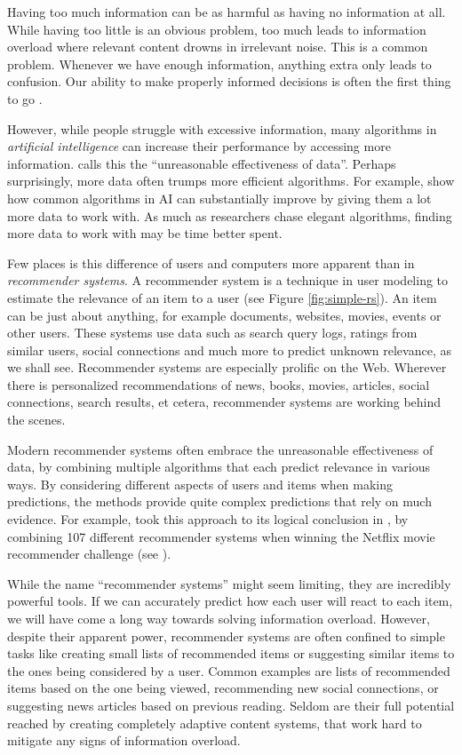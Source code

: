 \label{chap:intro}

Having too much information can be as harmful as having no information at all.
While having too little is an obvious problem,
too much leads to information overload where relevant content drowns in irrelevant noise.
This is a common problem. Whenever we have enough information,
anything extra only leads to confusion.
Our ability to make properly informed decisions is often the first thing to go
\cite[p1]{Davenport2001}.

However, while people struggle with excessive information,
many algorithms in \emph{artificial intelligence}  
can increase their performance by accessing more information.
\citet[p1]{Halevy2009} calls this the ``unreasonable effectiveness of data''.
Perhaps surprisingly, more data often trumps more efficient algorithms.
For example, \citet[p3]{Banko2001} show how common algorithms in AI 
can substantially improve by giving them a lot more data to work with.
As much as researchers chase elegant algorithms, finding more data to work with may be time better spent.

Few places is this difference of users and computers more apparent than in \emph{recommender systems}.
A recommender system is a technique in user modeling to estimate the relevance of an item to a user
(see Figure \ref{fig:simple-rs}).
An item can be just about anything, for example documents, websites, movies, events or other users.
These systems use data such as search query logs, 
ratings from similar users, social connections and much more
to predict unknown relevance, as we shall see.
Recommender systems are especially prolific on the Web. 
Wherever there is personalized recommendations of news, books, movies,
articles, social connections, search results, et cetera, recommender systems are working behind the scenes.

Modern recommender systems often embrace the 
unreasonable effectiveness of data,
by combining multiple algorithms that each predict relevance in various ways.
By considering different aspects of users and items when making predictions,
the methods provide quite complex predictions that rely on much evidence.
For example, \citeauthor{Bell2007} took this approach to its logical conclusion in \citet[p1]{Bell2007}, by 
combining 107 different recommender systems when winning the 
Netflix movie recommender challenge
(see \citet{Linden2009}).

While the name ``recommender systems'' might seem limiting, they are incredibly powerful tools.
If we can accurately predict how each user will react to each item,
we will have come a long way towards solving information overload.
However, despite their apparent power, recommender systems are often confined
to simple tasks like creating small lists of recommended items
or suggesting similar items to the ones being considered by a user.
Common examples are lists of recommended items based on the one being viewed, 
recommending new social connections, or suggesting news articles based on previous reading.
Seldom are their full potential reached by creating completely adaptive
content systems, that work hard to mitigate any signs of information overload.

